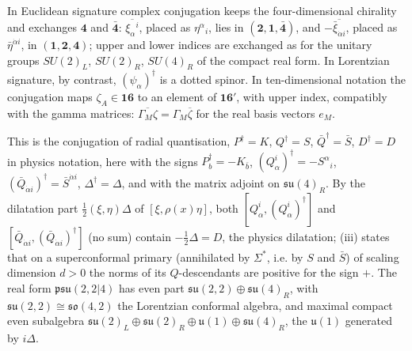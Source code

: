 \begin{remark}
In Euclidean signature complex conjugation keeps the four-dimensional chirality and exchanges $\mathbf4$ and $\bar{\mathbf4}$: $\overline{\xi_\alpha{}^i}$, placed as $\eta^\alpha{}_i$, lies in $(\mathbf2,\mathbf1,\bar{\mathbf4})$, and $-\overline{\bar\xi_{\dot\alpha i}}$, placed as $\bar\eta^{\dot\alpha i}$, in $(\mathbf1,\mathbf2,\mathbf4)$; upper and lower indices are exchanged as for the unitary groups $SU(2)_L$, $SU(2)_R$, $SU(4)_R$ of the compact real form. In Lorentzian signature, by contrast, $(\psi_\alpha)^\dagger$ is a dotted spinor. In ten-dimensional notation the conjugation maps $\zeta_A\in\mathbf{16}$ to an element of $\mathbf{16}'$, with upper index, compatibly with the gamma matrices: $\overline{\Gamma_M\zeta}=\Gamma_M\overline\zeta$ for the real basis vectors $e_M$.
\end{remark}

\begin{remark}
This is the conjugation of radial quantisation, $P^\dagger=K$, $Q^\dagger=S$, $\bar Q^\dagger=\bar S$, $D^\dagger=D$ in physics notation, here with the signs $P_b^\dagger=-K_{\bar b}$, $(Q^i_\alpha)^\dagger=-S^\alpha{}_i$, $(\bar Q_{\dot\alpha i})^\dagger=\bar S^{\dot\alpha i}$, $\Delta^\dagger=\Delta$, and with the matrix adjoint on $\mathfrak{su}(4)_R$. By the dilatation part $\tfrac12(\xi,\eta)\Delta$ of $[\xi,\rho(x)\eta]$, both $[Q^i_\alpha,(Q^i_\alpha)^\dagger]$ and $[\bar Q_{\dot\alpha i},(\bar Q_{\dot\alpha i})^\dagger]$ (no sum) contain $-\tfrac12\Delta=D$, the physics dilatation; (iii) states that on a superconformal primary (annihilated by $\Sigma^*$, i.e. by $S$ and $\bar S$) of scaling dimension $d>0$ the norms of its $Q$-descendants are positive for the sign $+$. The real form $\mathfrak{psu}(2,2|4)$ has even part $\mathfrak{su}(2,2)\oplus\mathfrak{su}(4)_R$, with $\mathfrak{su}(2,2)\cong\mathfrak{so}(4,2)$ the Lorentzian conformal algebra, and maximal compact even subalgebra $\mathfrak{su}(2)_L\oplus\mathfrak{su}(2)_R\oplus\mathfrak u(1)\oplus\mathfrak{su}(4)_R$, the $\mathfrak u(1)$ generated by $i\Delta$.
\end{remark}

